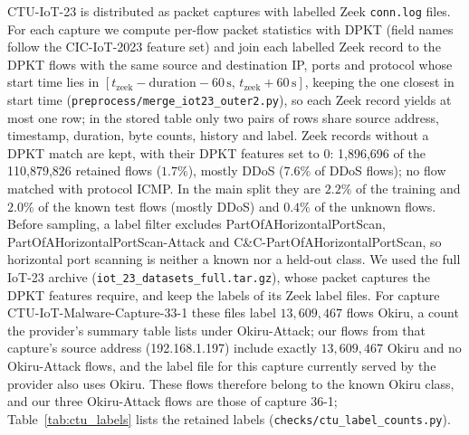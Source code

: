 \documentclass[journal]{IEEEtran}
\begin{document}
CTU-IoT-23 is distributed as packet captures with labelled Zeek \texttt{conn.log} files. For
each capture we compute per-flow packet statistics with DPKT (field names follow the
CIC-IoT-2023 feature set) and join each labelled Zeek record to the DPKT flows with the same
source and destination IP, ports and protocol whose start time lies in $[t_{\mathrm{zeek}}{-}\mathrm{duration}{-}60\,\mathrm{s},\,
t_{\mathrm{zeek}}{+}60\,\mathrm{s}]$, keeping the one closest in start time
(\texttt{preprocess/merge\_iot23\_outer2.py}), so each Zeek record yields at most one row; in the
stored table only two pairs of rows share source address, timestamp, duration, byte counts, history and label. Zeek records without a DPKT match are
kept, with their DPKT features set to 0: 1{,}896{,}696 of the 110{,}879{,}826 retained flows ($1.7\%$), mostly
DDoS ($7.6\%$ of DDoS flows); no flow matched with protocol ICMP. In the main split they are
$2.2\%$ of the training and $2.0\%$ of the known test flows (mostly DDoS) and $0.4\%$ of the
unknown flows. Before sampling, a label filter excludes PartOfAHorizontalPortScan,
PartOfAHorizontalPortScan-Attack and C\&C-PartOfAHorizontalPortScan, so horizontal port scanning
is neither a known nor a held-out class. We used the full IoT-23 archive
(\texttt{iot\_23\_datasets\_full.tar.gz}), whose packet captures the DPKT features require, and keep
the labels of its Zeek label files. For capture CTU-IoT-Malware-Capture-33-1 these files label
$13{,}609{,}467$ flows Okiru, a count the provider's summary table lists under Okiru-Attack; our
flows from that capture's source address (192.168.1.197) include exactly $13{,}609{,}467$ Okiru and
no Okiru-Attack flows, and the label file for this capture currently served by the provider also
uses Okiru. These flows therefore belong to the known Okiru class, and our three Okiru-Attack flows
are those of capture 36-1; Table~\ref{tab:ctu_labels} lists the retained labels
(\texttt{checks/ctu\_label\_counts.py}).
\end{document}
